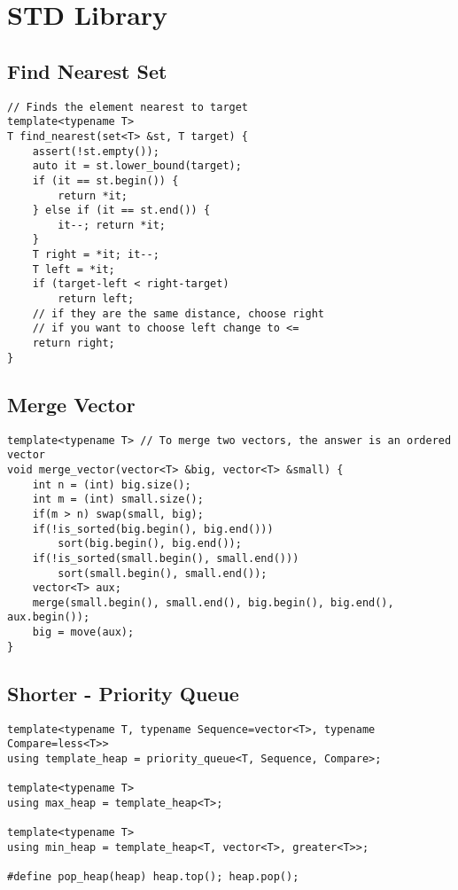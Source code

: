 \documentclass[10pt,letterpaper,twocolumn,twosided]{article}
\begin{document}

\section{STD Library}

\subsection{Find Nearest Set}
\begin{lstlisting}
// Finds the element nearest to target
template<typename T>
T find_nearest(set<T> &st, T target) {
    assert(!st.empty());
    auto it = st.lower_bound(target);
    if (it == st.begin()) {
        return *it;
    } else if (it == st.end()) {
        it--; return *it;
    }
    T right = *it; it--;
    T left = *it;
    if (target-left < right-target) 
        return left;
    // if they are the same distance, choose right
    // if you want to choose left change to <=
    return right;
}
\end{lstlisting}


\subsection{Merge Vector}
\begin{lstlisting}
template<typename T> // To merge two vectors, the answer is an ordered vector
void merge_vector(vector<T> &big, vector<T> &small) {
    int n = (int) big.size();
    int m = (int) small.size();
    if(m > n) swap(small, big);
    if(!is_sorted(big.begin(), big.end()))
        sort(big.begin(), big.end());
    if(!is_sorted(small.begin(), small.end()))
        sort(small.begin(), small.end());
    vector<T> aux;
    merge(small.begin(), small.end(), big.begin(), big.end(), aux.begin());
    big = move(aux);
}
\end{lstlisting}

\subsection{Shorter - Priority Queue}
\begin{lstlisting}
template<typename T, typename Sequence=vector<T>, typename Compare=less<T>>
using template_heap = priority_queue<T, Sequence, Compare>;

template<typename T>
using max_heap = template_heap<T>;

template<typename T>
using min_heap = template_heap<T, vector<T>, greater<T>>;

#define pop_heap(heap) heap.top(); heap.pop();
\end{lstlisting}
\end{document}
